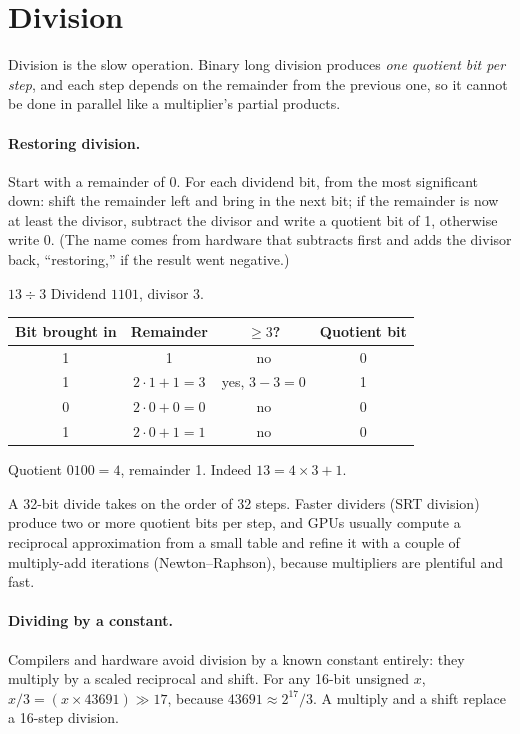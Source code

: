 \section{Division}

Division is the slow operation. Binary long division produces \emph{one quotient bit per step}, and each step depends on the remainder from the previous one, so it cannot be done in parallel like a multiplier's partial products.

\paragraph{Restoring division.} Start with a remainder of 0. For each dividend bit, from the most significant down: shift the remainder left and bring in the next bit; if the remainder is now at least the divisor, subtract the divisor and write a quotient bit of 1, otherwise write 0. (The name comes from hardware that subtracts first and adds the divisor back, ``restoring,'' if the result went negative.)

\begin{worked}{$13 \div 3$}
Dividend $1101$, divisor $3$.
\begin{center}
\begin{tabular}{cccc}
\toprule
Bit brought in & Remainder & $\ge 3$? & Quotient bit \\
\midrule
1 & 1 & no & 0 \\
1 & $2 \cdot 1 + 1 = 3$ & yes, $3 - 3 = 0$ & 1 \\
0 & $2 \cdot 0 + 0 = 0$ & no & 0 \\
1 & $2 \cdot 0 + 1 = 1$ & no & 0 \\
\bottomrule
\end{tabular}
\end{center}
Quotient $0100 = 4$, remainder 1. Indeed $13 = 4 \times 3 + 1$.
\end{worked}

A 32-bit divide takes on the order of 32 steps. Faster dividers (SRT division) produce two or more quotient bits per step, and GPUs usually compute a reciprocal approximation from a small table and refine it with a couple of multiply-add iterations (Newton--Raphson), because multipliers are plentiful and fast.

\paragraph{Dividing by a constant.} Compilers and hardware avoid division by a known constant entirely: they multiply by a scaled reciprocal and shift. For any 16-bit unsigned $x$, $x / 3 = (x \times 43691) \gg 17$, because $43691 \approx 2^{17}/3$. A multiply and a shift replace a 16-step division.

